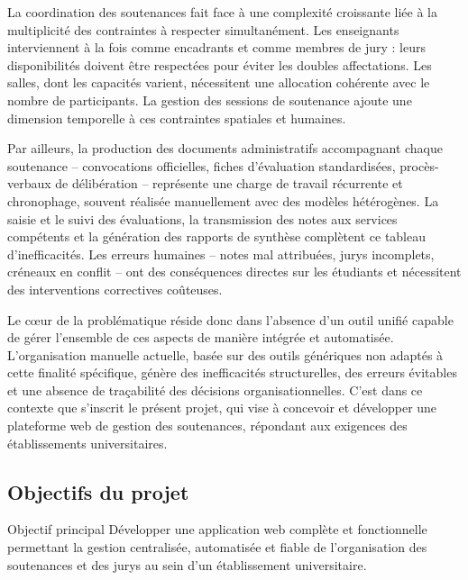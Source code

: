 La coordination des soutenances fait face à une complexité croissante liée à la multiplicité des contraintes à respecter simultanément. Les enseignants interviennent à la fois comme encadrants et comme membres de jury : leurs disponibilités doivent être respectées pour éviter les doubles affectations. Les salles, dont les capacités varient, nécessitent une allocation cohérente avec le nombre de participants. La gestion des sessions de soutenance ajoute une dimension temporelle à ces contraintes spatiales et humaines.

Par ailleurs, la production des documents administratifs accompagnant chaque soutenance -- convocations officielles, fiches d'évaluation standardisées, procès-verbaux de délibération -- représente une charge de travail récurrente et chronophage, souvent réalisée manuellement avec des modèles hétérogènes. La saisie et le suivi des évaluations, la transmission des notes aux services compétents et la génération des rapports de synthèse complètent ce tableau d'inefficacités. Les erreurs humaines -- notes mal attribuées, jurys incomplets, créneaux en conflit -- ont des conséquences directes sur les étudiants et nécessitent des interventions correctives coûteuses.

Le cœur de la problématique réside donc dans l'absence d'un outil unifié capable de gérer l'ensemble de ces aspects de manière intégrée et automatisée. L'organisation manuelle actuelle, basée sur des outils génériques non adaptés à cette finalité spécifique, génère des inefficacités structurelles, des erreurs évitables et une absence de traçabilité des décisions organisationnelles. C'est dans ce contexte que s'inscrit le présent projet, qui vise à concevoir et développer une plateforme web de gestion des soutenances, répondant aux exigences des établissements universitaires.

\subsection*{Objectifs du projet}
\label{intro:objectifs}

\begin{projectbox}{Objectif principal}
    Développer une application web complète et fonctionnelle permettant la gestion centralisée, automatisée et fiable de l'organisation des soutenances et des jurys au sein d'un établissement universitaire.
\end{projectbox}

